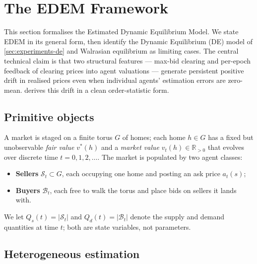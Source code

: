 \section{The EDEM Framework}
\label{sec:framework}

This section formalises the Estimated Dynamic Equilibrium Model. We
state EDEM in its general form, then identify the Dynamic Equilibrium
(DE) model of \cref{sec:experiments-de} and Walrasian equilibrium as
limiting cases. The central technical claim is that two structural
features --- max-bid clearing and per-epoch feedback of clearing
prices into agent valuations --- generate persistent positive drift
in realised prices even when individual agents' estimation errors are
zero-mean.  derives this drift in a
clean order-statistic form.

\subsection{Primitive objects}
\label{sec:framework-primitives}

A market is staged on a finite torus $G$ of homes; each home
$h \in G$ has a fixed but unobservable \emph{fair value} $v^{*}(h)$ and
a \emph{market value} $v_{t}(h) \in \mathbb{R}_{>0}$ that evolves over
discrete time $t = 0, 1, 2, \dots$. The market is populated by two
agent classes:
\begin{itemize}[leftmargin=*]
\item \textbf{Sellers} $\mathcal{S}_{t} \subset G$, each occupying one
      home and posting an ask price $a_{t}(s)$;
\item \textbf{Buyers} $\mathcal{B}_{t}$, each free to walk the torus
      and place bids on sellers it lands with.
\end{itemize}
We let $Q_{s}(t) = |\mathcal{S}_{t}|$ and $Q_{d}(t) = |\mathcal{B}_{t}|$
denote the supply and demand quantities at time $t$; both are
state variables, not parameters.

\subsection{Heterogeneous estimation}
\label{sec:framework-estimation}

